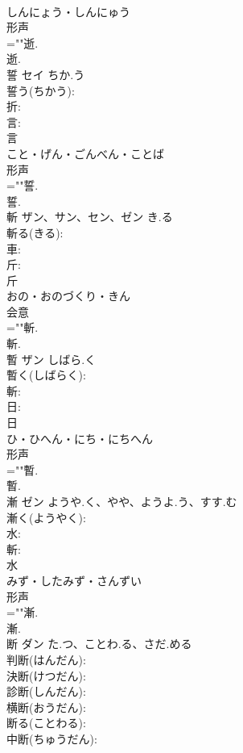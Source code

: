\documentclass[8pt]{extreport}
\begin{document}
\begin{CJK}{UTF8}{min}
\\	しんにょう・しんにゅう	
\\	形声 
\\	=""逝.
\\	逝.
\\	誓	セイ	ちか.う		
\\	誓う(ちかう): 
\\	折: 
\\	言: 
\\	言	
\\	こと・げん・ごんべん・ことば	
\\	形声 
\\	=""誓.
\\	誓.
\\	斬	ザン、サン、セン、ゼン	き.る		
\\	斬る(きる): 
\\	車: 
\\	斤: 
\\	斤	
\\	おの・おのづくり・きん	
\\	会意 
\\	=""斬.
\\	斬.
\\	暫	ザン	しばら.く		
\\	暫く(しばらく): 
\\	斬: 
\\	日: 
\\	日	
\\	ひ・ひへん・にち・にちへん	
\\	形声 
\\	=""暫.
\\	暫.
\\	漸	ゼン	ようや.く、やや、ようよ.う、すす.む		
\\	漸く(ようやく): 
\\	水: 
\\	斬: 
\\	水	
\\	みず・したみず・さんずい	
\\	形声 
\\	=""漸.
\\	漸.
\\	断	ダン	た.つ、ことわ.る、さだ.める		
\\	判断(はんだん): 
\\	決断(けつだん): 
\\	診断(しんだん): 
\\	横断(おうだん): 
\\	断る(ことわる): 
\\	中断(ちゅうだん): 

\end{CJK}
\end{document}
